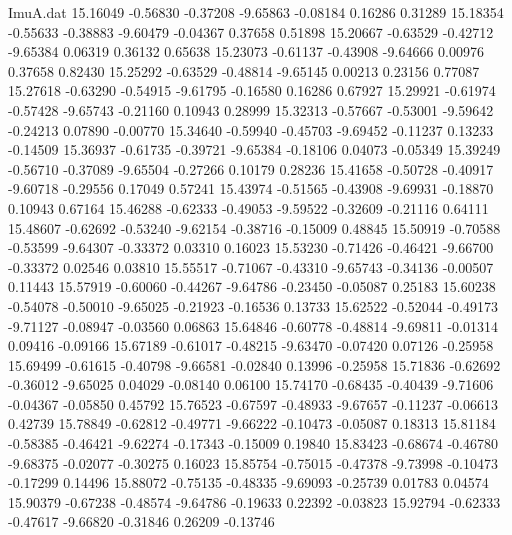 \begin{filecontents}{ImuA.dat}
  15.16049   -0.56830   -0.37208   -9.65863   -0.08184    0.16286    0.31289
  15.18354   -0.55633   -0.38883   -9.60479   -0.04367    0.37658    0.51898
  15.20667   -0.63529   -0.42712   -9.65384    0.06319    0.36132    0.65638
  15.23073   -0.61137   -0.43908   -9.64666    0.00976    0.37658    0.82430
  15.25292   -0.63529   -0.48814   -9.65145    0.00213    0.23156    0.77087
  15.27618   -0.63290   -0.54915   -9.61795   -0.16580    0.16286    0.67927
  15.29921   -0.61974   -0.57428   -9.65743   -0.21160    0.10943    0.28999
  15.32313   -0.57667   -0.53001   -9.59642   -0.24213    0.07890   -0.00770
  15.34640   -0.59940   -0.45703   -9.69452   -0.11237    0.13233   -0.14509
  15.36937   -0.61735   -0.39721   -9.65384   -0.18106    0.04073   -0.05349
  15.39249   -0.56710   -0.37089   -9.65504   -0.27266    0.10179    0.28236
  15.41658   -0.50728   -0.40917   -9.60718   -0.29556    0.17049    0.57241
  15.43974   -0.51565   -0.43908   -9.69931   -0.18870    0.10943    0.67164
  15.46288   -0.62333   -0.49053   -9.59522   -0.32609   -0.21116    0.64111
  15.48607   -0.62692   -0.53240   -9.62154   -0.38716   -0.15009    0.48845
  15.50919   -0.70588   -0.53599   -9.64307   -0.33372    0.03310    0.16023
  15.53230   -0.71426   -0.46421   -9.66700   -0.33372    0.02546    0.03810
  15.55517   -0.71067   -0.43310   -9.65743   -0.34136   -0.00507    0.11443
  15.57919   -0.60060   -0.44267   -9.64786   -0.23450   -0.05087    0.25183
  15.60238   -0.54078   -0.50010   -9.65025   -0.21923   -0.16536    0.13733
  15.62522   -0.52044   -0.49173   -9.71127   -0.08947   -0.03560    0.06863
  15.64846   -0.60778   -0.48814   -9.69811   -0.01314    0.09416   -0.09166
  15.67189   -0.61017   -0.48215   -9.63470   -0.07420    0.07126   -0.25958
  15.69499   -0.61615   -0.40798   -9.66581   -0.02840    0.13996   -0.25958
  15.71836   -0.62692   -0.36012   -9.65025    0.04029   -0.08140    0.06100
  15.74170   -0.68435   -0.40439   -9.71606   -0.04367   -0.05850    0.45792
  15.76523   -0.67597   -0.48933   -9.67657   -0.11237   -0.06613    0.42739
  15.78849   -0.62812   -0.49771   -9.66222   -0.10473   -0.05087    0.18313
  15.81184   -0.58385   -0.46421   -9.62274   -0.17343   -0.15009    0.19840
  15.83423   -0.68674   -0.46780   -9.68375   -0.02077   -0.30275    0.16023
  15.85754   -0.75015   -0.47378   -9.73998   -0.10473   -0.17299    0.14496
  15.88072   -0.75135   -0.48335   -9.69093   -0.25739    0.01783    0.04574
  15.90379   -0.67238   -0.48574   -9.64786   -0.19633    0.22392   -0.03823
  15.92794   -0.62333   -0.47617   -9.66820   -0.31846    0.26209   -0.13746

\end{filecontents}

